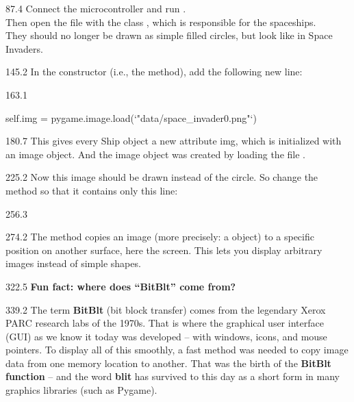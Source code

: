 \documentclass{aslab}
\newcommand*\St[1]{\textcolor{codemaroon}{#1}}  %
\begin{document}
\begin{region}[pitch=13.3]{87.4}
Connect the microcontroller and run .\\
Then open the file  with the class , which is
responsible for the spaceships.\\
They should no longer be drawn as simple filled circles, but look like in
Space Invaders.
\end{region}

\begin{region}{145.2}
In the constructor (i.e., the  method), add the following new
line:
\end{region}

\begin{region}{163.1}
\begin{codeblock}[escapechar=`]
self.img = pygame.image.load(`\St{"data/space\_invader0.png"}`)
\end{codeblock}
\end{region}

\begin{region}[pitch=13.35]{180.7}
This gives every Ship object a new attribute img, which is initialized with
an image object. And the image object was created by loading the file
.
\end{region}

\begin{region}[pitch=13.3]{225.2}
Now this image should be drawn instead of the circle. So change the method
 so that it contains only this line:
\end{region}

\begin{region}{256.3}
\end{region}

\begin{region}[pitch=13.2]{274.2}
The  method copies an image (more precisely: a 
object) to a specific position on another surface, here the screen. This
lets you display arbitrary images instead of simple shapes.
\end{region}

\begin{region}{322.5}
 \textbf{Fun fact: where does ``BitBlt'' come from?}
\end{region}

\begin{region}[pitch=13.42]{339.2}
The term \textbf{BitBlt} (bit block transfer) comes from the legendary Xerox
PARC research labs of the 1970s. That is where the graphical user interface
(GUI) as we know it today was developed -- with windows, icons, and mouse
pointers. To display all of this smoothly, a fast method was needed to copy
image data from one memory location to another. That was the birth of the
\textbf{BitBlt function} -- and the word \textbf{blit} has survived to this
day as a short form in many graphics libraries (such as Pygame).
\end{region}
\end{document}
